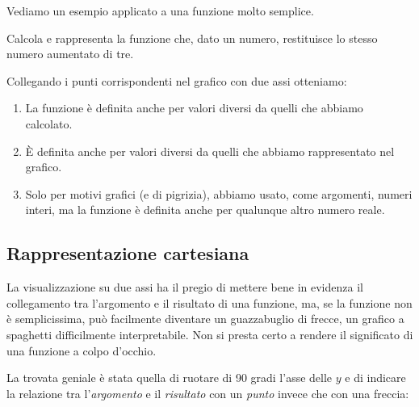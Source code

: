 \dueassivuoti

Vediamo un esempio applicato a una funzione molto semplice.

\begin{esempio}
Calcola e rappresenta la funzione che, dato un numero, restituisce lo 
stesso numero aumentato di tre.


Collegando i punti corrispondenti nel grafico con due assi otteniamo:

\end{esempio}

\begin{osservazione}
\begin{enumerate} [nosep]
\item La funzione è definita anche per valori diversi da quelli che abbiamo 
calcolato.
\item È definita anche per valori diversi da quelli che abbiamo 
rappresentato nel grafico.
\item Solo per motivi grafici (e di pigrizia), abbiamo usato, come argomenti, 
numeri interi, ma la funzione è definita anche per qualunque altro numero 
reale.
\end{enumerate}
\end{osservazione}

\subsection{Rappresentazione cartesiana}
\label{sec:funzioni2_rcartesiana}

La visualizzazione su due assi ha il pregio di mettere bene in evidenza il 
collegamento tra l'argomento e il risultato di una funzione, ma, se la 
funzione non è semplicissima, può facilmente diventare un guazzabuglio di 
frecce, un grafico a spaghetti difficilmente interpretabile. Non si presta 
certo a rendere il significato di una funzione a colpo d'occhio.

La trovata geniale è stata quella di ruotare di 90 gradi l'asse delle \(y\) e 
di indicare la relazione tra l'\emph{argomento} e il \emph{risultato} con 
un \emph{punto} invece che con una freccia:

\vspace{1em}
